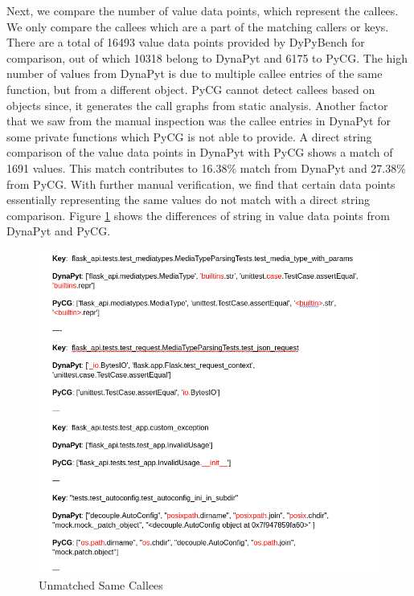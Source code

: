 Next, we compare the number of value data points, which represent the callees.
We only compare the callees which are a part of the matching callers or keys.
There are a total of 16493 value data points provided by DyPyBench for comparison, out of which 10318 belong to DynaPyt and 6175 to PyCG.%
The high number of values from DynaPyt is due to multiple callee entries of the same function, but from a different object.
PyCG cannot detect callees based on objects since, it generates the call graphs from static analysis.
Another factor that we saw from the manual inspection was the callee entries in DynaPyt for some private functions which PyCG is not able to provide. 
A direct string comparison of the value data points in DynaPyt with PyCG shows a match of 1691 values.
This match contributes to 16.38\% match from DynaPyt and 27.38\% from PyCG.
With further manual verification, we find that certain data points essentially representing the same values do not match with a direct string comparison.
Figure \ref{fig:unmatched_value_strings} shows the differences of string in value data points from DynaPyt and PyCG.
\begin{figure}[ht]
    \centering
    \includegraphics[width=0.8\linewidth]{figures/evaluation/string_compare.png}
    \caption[Unmatched Same Callees]{\label{fig:unmatched_value_strings}Unmatched Same Callees }
\end{figure}

